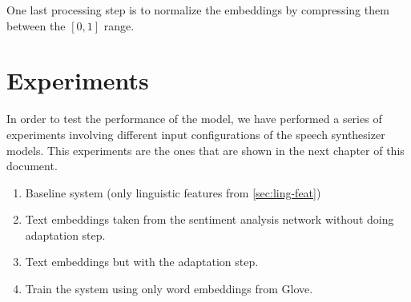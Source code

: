 One last processing step is to normalize the embeddings by compressing them between the $[0, 1]$ range.

\section{Experiments}

In order to test the performance of the model, we have performed a series of experiments involving different input configurations of the speech synthesizer models. This experiments are the ones that are shown in the next chapter of this document. %

\begin{enumerate}
    \item Baseline system (only linguistic features from \ref{sec:ling-feat})
    \item Text embeddings taken from the sentiment analysis network without doing adaptation step.
    \item Text embeddings but with the adaptation step.
    \item Train the system using only word embeddings from Glove.
\end{enumerate}
